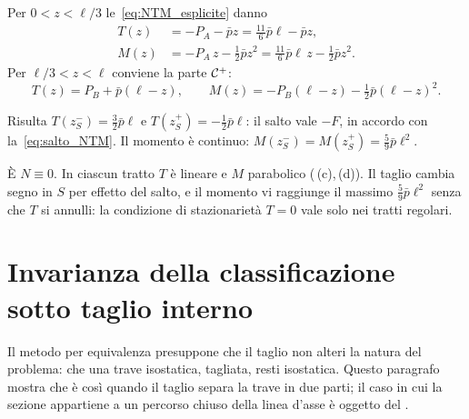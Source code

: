 \begin{esempio}
\begin{svolgimento}


		Per $0 < z < \ell/3$ le~\eqref{eq:NTM_esplicite}
		danno
		\begin{align*}
			T(z) &= -P_A - \bar p z = \tfrac{11}{6}\bar p\ell - \bar p z,\\
			M(z) &= -P_A\,z - \tfrac{1}{2}\bar p z^2
			= \tfrac{11}{6}\bar p\ell\,z - \tfrac{1}{2}\bar p z^2.
		\end{align*}
		Per $\ell/3 < z < \ell$ conviene la parte $\mathcal{C}^+$:
		\begin{equation*}
			T(z) = P_B + \bar p(\ell - z),
			\qquad
			M(z) = -P_B(\ell - z) - \tfrac{1}{2}\bar p(\ell - z)^2.
		\end{equation*}
		
		Risulta $T(z_S^-) = \tfrac{3}{2}\bar p\ell$ e
		$T(z_S^+) = -\tfrac{1}{2}\bar p\ell$: il salto
		vale $-F$, in accordo con la~\eqref{eq:salto_NTM}.
		Il momento è continuo:
		$M(z_S^-) = M(z_S^+) = \tfrac{5}{9}\bar p\ell^2$.
		
		È $N \equiv 0$. In ciascun tratto $T$ è lineare
		e $M$ parabolico (\,(c),\,(d)).
		Il taglio cambia segno in $S$ per effetto del
		salto, e il momento vi raggiunge il massimo
		$\tfrac{5}{9}\bar p\ell^2$ senza che $T$ si
		annulli: la condizione di stazionarietà
		$T = 0$ vale solo nei tratti regolari.
		
	\end{svolgimento}
\end{esempio}



\section{Invarianza della classificazione sotto taglio interno}
\label{sec:invarianza_classificazione}

Il metodo per equivalenza presuppone che il taglio non
alteri la natura del problema: che una trave isostatica,
tagliata, resti isostatica. Questo paragrafo mostra che è
così quando il taglio separa la trave in due parti; il
caso in cui la sezione appartiene a un percorso chiuso
della linea d'asse è oggetto del .

